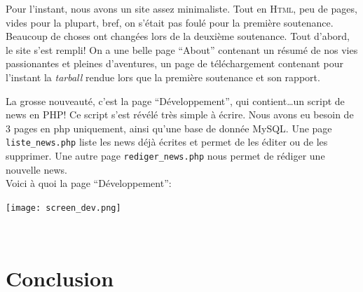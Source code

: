 \documentclass[a4paper,12pt]{report}
\begin{document}
		Pour l'instant, nous avons un site assez minimaliste. Tout en \textsc{Html}, peu de pages, vides pour la plupart, bref, on s'\'etait pas foul\'e pour la premi\`ere soutenance. Beaucoup de choses ont chang\'ees lors de la deuxi\`eme soutenance. Tout d'abord, le site s'est rempli! On a une belle page ``About'' contenant un r\'esum\'e de nos vies passionantes et pleines d'aventures, un page de t\'el\'echargement contenant pour l'instant la \emph{tarball} rendue lors que la premi\`ere soutenance et son rapport.

		La grosse nouveaut\'e, c'est la page ``D\'eveloppement'', qui contient\ldots un script de news en PHP! Ce script s'est r\'ev\'el\'e tr\`es simple \`a \'ecrire. Nous avons eu besoin de 3 pages en php uniquement, ainsi qu'une base de donn\'ee MySQL. Une page \verb!liste_news.php! liste les news d\'ej\`a \'ecrites et permet de les \'editer ou de les supprimer. Une autre page \verb!rediger_news.php! nous permet de r\'ediger une nouvelle news. \\
		Voici à quoi la page ``D\'eveloppement'':


		\begin{center}

			\texttt{[image: screen\_dev.png]}\\
			\caption{\emph{ }}\\
		\end{center}

		



\chapter{Conclusion} %
\label{cha:conclusion}
\end{document}
